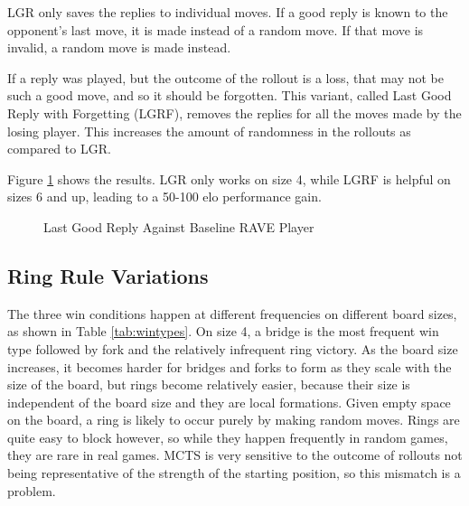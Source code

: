 LGR only saves the replies to individual moves. If a good reply is known to the opponent's last move, it is made instead of a random move. If that move is invalid, a random move is made instead.

If a reply was played, but the outcome of the rollout is a loss, that may not be such a good move, and so it should be forgotten. This variant, called Last Good Reply with Forgetting (LGRF), removes the replies for all the moves made by the losing player. This increases the amount of randomness in the rollouts as compared to LGR.

Figure \ref{fig:lgr} shows the results. LGR only works on size 4, while LGRF is helpful on sizes 6 and up, leading to a 50-100 elo performance gain.

\begin{figure}
	\centering
{}
	\caption{Last Good Reply Against Baseline RAVE Player}
	\label{fig:lgr}
\end{figure}


\subsection{Ring Rule Variations}\label{sec:ringrules}

The three win conditions happen at different frequencies on different board sizes, as shown in Table \ref{tab:wintypes}. On size 4, a bridge is the most frequent win type followed by fork and the relatively infrequent ring victory. As the board size increases, it becomes harder for bridges and forks to form as they scale with the size of the board, but rings become relatively easier, because their size is independent of the board size and they are local formations. Given empty space on the board, a ring is likely to occur purely by making random moves. Rings are quite easy to block however, so while they happen frequently in random games, they are rare in real games. MCTS is very sensitive to the outcome of rollouts not being representative of the strength of the starting position, so this mismatch is a problem.

